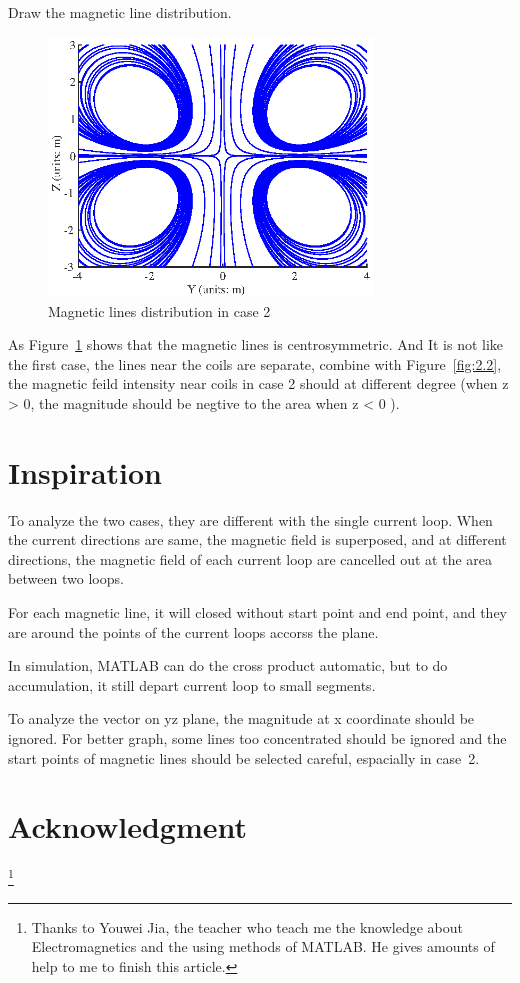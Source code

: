 \documentclass[10pt, journal, final]{IEEEtran}
\begin{document}
Draw the magnetic line distribution.


\begin{figure}[htbp]
    \centering
    \includegraphics[width = 3.4in]{figures/work2.3.eps}
    \caption{Magnetic lines distribution in case 2}
    \label{fig:2.3}
\end{figure}

As Figure~\ref{fig:2.3} shows that the magnetic lines is centrosymmetric. And It is not like the first case, 
the lines near the coils are separate, combine with Figure~\ref{fig:2.2},
the magnetic feild intensity near coils in case 2 should at different degree (when z > 0, the magnitude should be negtive to 
the area when z < 0 ).
\section{
  Inspiration
 }
\label{sec: Ins}
To analyze the two cases, they are different with the single current loop. When the current directions are same, 
the magnetic field is superposed, and at different directions, the magnetic field of each current loop are cancelled out 
at the area between two loops.\par
For each magnetic line, it will closed without start point and end point, and they are around the points of 
the current loops accorss the plane.\par
In simulation, MATLAB can do the cross product automatic, but to do accumulation, it still depart current loop to small 
segments.\par
To analyze the vector on yz plane, the magnitude at x coordinate should be ignored. For better graph, 
some lines too concentrated should be ignored and the start points of magnetic lines should be selected careful, 
espacially in case~2. 



\section*{Acknowledgment}
\thanks{
    Thanks to Youwei Jia, the teacher who teach me the knowledge about Electromagnetics
    and the using methods of MATLAB. He gives amounts of help to me to finish this article.
}
\end{document}
